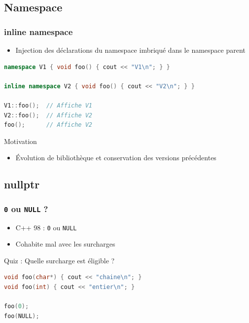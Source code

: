 \documentclass[C++.tex]{subfiles}
\begin{document}
\subsection*{Namespace}
\begin{frame}[fragile]
	\frametitle{inline namespace}
	\begin{itemize}
		\item Injection des déclarations du namespace imbriqué dans le namespace parent
	\end{itemize}

	\begin{lstlisting}[language=C++]
namespace V1 { void foo() { cout << "V1\n"; } }

inline namespace V2 { void foo() { cout << "V2\n"; } }

V1::foo();  // Affiche V1
V2::foo();  // Affiche V2
foo();      // Affiche V2\end{lstlisting}

	\begin{block}{Motivation}
		\begin{itemize}
			\item Évolution de bibliothèque et conservation des versions précédentes
		\end{itemize}
	\end{block}
\end{frame}

\subsection*{nullptr}
\begin{frame}[fragile]
	\frametitle{\lstinline|0| ou \lstinline|NULL| ?}
	\begin{itemize}
		\item C++ 98 : \lstinline|0| ou \lstinline|NULL|


		\item Cohabite mal avec les surcharges
	\end{itemize}

	\begin{block}{Quiz : Quelle surcharge est éligible ?}
		\begin{lstlisting}[language=C++]
void foo(char*) { cout << "chaine\n"; }
void foo(int) { cout << "entier\n"; }

foo(0);
foo(NULL);\end{lstlisting}
	\end{block}


\end{frame}
\end{document}
